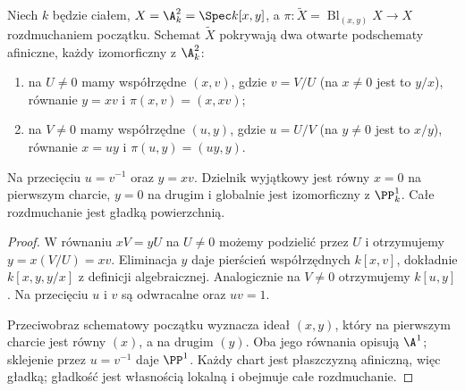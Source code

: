 \begin{twierdzenie}
\label{tw:ga5-plane-charts}
Niech $k$ będzie ciałem, $X=\A^2_k=\Spec k[x,y]$,
a $\pi:\widetilde X=\operatorname{Bl}_{(x,y)}X\to X$
rozdmuchaniem początku. Schemat $\widetilde X$ pokrywają
dwa otwarte podschematy afiniczne, każdy izomorficzny z
$\A^2_k$:
\begin{enumerate}[label=(\roman*)]
\item na $U\ne0$ mamy współrzędne $(x,v)$, gdzie
$v=V/U$ (na $x\ne0$ jest to $y/x$), równanie $y=xv$ i
$\pi(x,v)=(x,xv)$;
\item na $V\ne0$ mamy współrzędne $(u,y)$, gdzie
$u=U/V$ (na $y\ne0$ jest to $x/y$), równanie $x=uy$ i
$\pi(u,y)=(uy,y)$.
\end{enumerate}
Na przecięciu $u=v^{-1}$ oraz $y=xv$.
Dzielnik wyjątkowy jest równy $x=0$ na pierwszym
charcie, $y=0$ na drugim i globalnie jest izomorficzny
z $\PP^1_k$. Całe rozdmuchanie jest gładką powierzchnią.
\end{twierdzenie}
\begin{proof}
W równaniu $xV=yU$ na $U\ne0$ możemy podzielić przez
$U$ i otrzymujemy $y=x(V/U)=xv$. Eliminacja $y$
daje pierścień współrzędnych $k[x,v]$, dokładnie
$k[x,y,y/x]$ z definicji algebraicznej. Analogicznie
na $V\ne0$ otrzymujemy $k[u,y]$. Na przecięciu
$u$ i $v$ są odwracalne oraz $uv=1$.

Przeciwobraz schematowy początku wyznacza ideał
$(x,y)$, który na pierwszym charcie jest równy $(x)$,
a na drugim $(y)$. Oba jego równania opisują
$\A^1$; sklejenie przez $u=v^{-1}$ daje $\PP^1$.
Każdy chart jest płaszczyzną afiniczną, więc gładką;
gładkość jest własnością lokalną i obejmuje całe
rozdmuchanie.
\end{proof}

